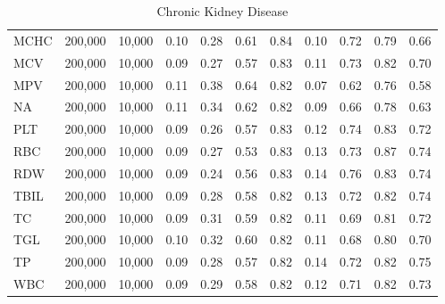 \begin{table}[ht]
\begin{tabular}{lrrrrrrrrrr}
MCHC & 200,000 & 10,000 & 0.10 & 0.28 & 0.61 & 0.84 & 0.10 & 0.72 & 0.79 & 0.66 \\
MCV & 200,000 & 10,000 & 0.09 & 0.27 & 0.57 & 0.83 & 0.11 & 0.73 & 0.82 & 0.70 \\
MPV & 200,000 & 10,000 & 0.11 & 0.38 & 0.64 & 0.82 & 0.07 & 0.62 & 0.76 & 0.58 \\
NA & 200,000 & 10,000 & 0.11 & 0.34 & 0.62 & 0.82 & 0.09 & 0.66 & 0.78 & 0.63 \\
PLT & 200,000 & 10,000 & 0.09 & 0.26 & 0.57 & 0.83 & 0.12 & 0.74 & 0.83 & 0.72 \\
RBC & 200,000 & 10,000 & 0.09 & 0.27 & 0.53 & 0.83 & 0.13 & 0.73 & 0.87 & 0.74 \\
RDW & 200,000 & 10,000 & 0.09 & 0.24 & 0.56 & 0.83 & 0.14 & 0.76 & 0.83 & 0.74 \\
TBIL & 200,000 & 10,000 & 0.09 & 0.28 & 0.58 & 0.82 & 0.13 & 0.72 & 0.82 & 0.74 \\
TC & 200,000 & 10,000 & 0.09 & 0.31 & 0.59 & 0.82 & 0.11 & 0.69 & 0.81 & 0.72 \\
TGL & 200,000 & 10,000 & 0.10 & 0.32 & 0.60 & 0.82 & 0.11 & 0.68 & 0.80 & 0.70 \\
TP & 200,000 & 10,000 & 0.09 & 0.28 & 0.57 & 0.82 & 0.14 & 0.72 & 0.82 & 0.75 \\
WBC & 200,000 & 10,000 & 0.09 & 0.29 & 0.58 & 0.82 & 0.12 & 0.71 & 0.82 & 0.73 \\
\bottomrule
\end{tabular}
\caption{Chronic Kidney Disease}
\end{table}